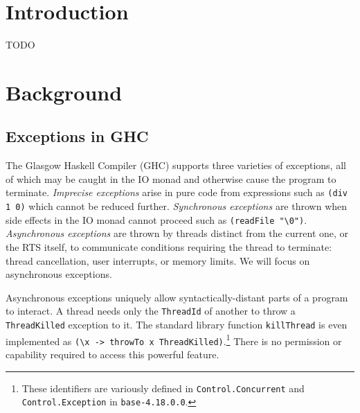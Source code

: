 \documentclass[sigplan,screen,review,anonymous]{acmart}
\begin{document}


\maketitle


\section{Introduction}

TODO

\section{Background}

\subsection{Exceptions in GHC}

The Glasgow Haskell Compiler (GHC) supports three varieties of exceptions, all
of which may be caught in the IO monad and otherwise cause the program to
terminate.
%
\emph{Imprecise exceptions} arise in pure code from expressions such as
\verb|(div 1 0)| which cannot be reduced further.
%
\emph{Synchronous exceptions} are thrown when side effects in the IO monad
cannot proceed such as \verb|(readFile "\0")|.
%
\emph{Asynchronous exceptions} are thrown by threads distinct from the current
one, or the RTS itself, to communicate conditions requiring the thread to
terminate: thread cancellation, user interrupts, or memory limits.
%
We will focus on asynchronous exceptions.

Asynchronous exceptions uniquely allow syntactically-distant parts of a program
to interact.
%
A thread needs only the \verb|ThreadId| of another
to throw a \verb|ThreadKilled| exception to it.
The standard library function \verb|killThread|
is even implemented as \verb|(\x -> throwTo x ThreadKilled)|.\footnote{
    These identifiers are variously defined in \texttt{Control.Concurrent} and
    \texttt{Control.Exception} in \texttt{base-4.18.0.0}.
}
%
There is no permission or capability required to access this powerful feature.
\end{document}
